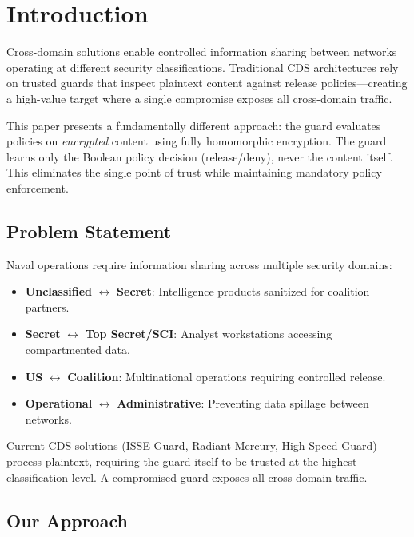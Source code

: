 \documentclass[11pt,letterpaper]{article}
\begin{document}
\section{Introduction}

Cross-domain solutions enable controlled information sharing between networks operating at different security classifications. Traditional CDS architectures rely on trusted guards that inspect plaintext content against release policies---creating a high-value target where a single compromise exposes all cross-domain traffic.

This paper presents a fundamentally different approach: the guard evaluates policies on \emph{encrypted} content using fully homomorphic encryption. The guard learns only the Boolean policy decision (release/deny), never the content itself. This eliminates the single point of trust while maintaining mandatory policy enforcement.

\subsection{Problem Statement}

Naval operations require information sharing across multiple security domains:
\begin{itemize}
\item \textbf{Unclassified} $\leftrightarrow$ \textbf{Secret}: Intelligence products sanitized for coalition partners.
\item \textbf{Secret} $\leftrightarrow$ \textbf{Top Secret/SCI}: Analyst workstations accessing compartmented data.
\item \textbf{US} $\leftrightarrow$ \textbf{Coalition}: Multinational operations requiring controlled release.
\item \textbf{Operational} $\leftrightarrow$ \textbf{Administrative}: Preventing data spillage between networks.
\end{itemize}

Current CDS solutions (ISSE Guard, Radiant Mercury, High Speed Guard) process plaintext, requiring the guard itself to be trusted at the highest classification level. A compromised guard exposes all cross-domain traffic.

\subsection{Our Approach}
\end{document}
